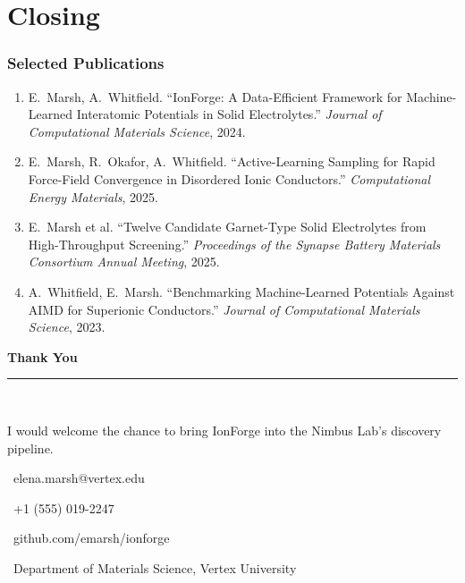 \section{Closing}

\begin{frame}
\frametitle{Selected Publications}

\small
\begin{enumerate}
  \item E.\ Marsh, A.\ Whitfield. ``IonForge: A Data-Efficient Framework for Machine-Learned Interatomic Potentials in Solid Electrolytes.'' \emph{Journal of Computational Materials Science}, 2024.
  \item E.\ Marsh, R.\ Okafor, A.\ Whitfield. ``Active-Learning Sampling for Rapid Force-Field Convergence in Disordered Ionic Conductors.'' \emph{Computational Energy Materials}, 2025.
  \item E.\ Marsh et al. ``Twelve Candidate Garnet-Type Solid Electrolytes from High-Throughput Screening.'' \emph{Proceedings of the Synapse Battery Materials Consortium Annual Meeting}, 2025.
  \item A.\ Whitfield, E.\ Marsh. ``Benchmarking Machine-Learned Potentials Against AIMD for Superionic Conductors.'' \emph{Journal of Computational Materials Science}, 2023.
\end{enumerate}
\end{frame}

\begin{frame}[plain]
\vspace{1.4cm}
\begin{center}
{\color{white}\Huge\bfseries Thank You\par}
\vspace{0.4cm}
{\color{accent}\rule{0.5\linewidth}{1.5pt}}\\[0.6cm]
{\color{white!90!black}\large I would welcome the chance to bring IonForge into the Nimbus Lab's discovery pipeline.\par}
\vspace{0.9cm}
{\color{white}\normalsize \faEnvelope\ elena.marsh@vertex.edu\par}
\vspace{0.15cm}
{\color{white}\normalsize \faPhone\ +1 (555) 019-2247\par}
\vspace{0.15cm}
{\color{white}\normalsize \faGlobe\ github.com/emarsh/ionforge\par}
\vspace{0.15cm}
{\color{white}\normalsize \faMapMarker\ Department of Materials Science, Vertex University\par}
\end{center}
\end{frame}
